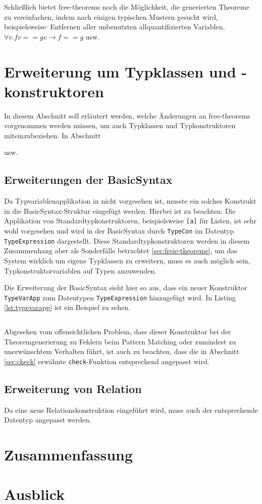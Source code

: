 \documentclass[11pt]{article} %
\begin{document}
Schließlich bietet free-theorems noch die Möglichkeit, die generierten Theoreme zu vereinfachen, indem nach einigen typischen
Mustern gesucht wird, beispielsweise: Entfernen aller unbenutzten allquantifizierten Variablen, $\forall v. f v == g v \rightarrow f == g$ usw.

\section{Erweiterung um Typklassen und -konstruktoren}
\label{sec:erweiterung-typklassen}

In diesem Abschnitt soll erläutert werden, welche Änderungen an free-theorems vorgenommen werden müssen, um auch Typklassen und Typkonstruktoren miteinzubeziehen. In
Abschnitt 

usw.

\subsection{Erweiterungen der BasicSyntax}

Da Typvariablenapplikation in \cite{freetheorems} nicht vorgesehen ist, musste ein solches Konstrukt in die BasicSyntax-Struktur eingefügt werden. Hierbei ist zu beachten: Die Applikation
von Standardtypkonstruktoren, beispielsweise \texttt{[a]} für Listen, ist sehr wohl vorgesehen und wird in der BasicSyntax durch \texttt{TypeCon} im Datentyp \texttt{TypeExpression} dargestellt.  Diese Standardtypkonstruktoren werden in diesem Zusammenhang aber als Sonderfälle betrachtet \ref{sec:freie-theoreme}, um das System wirklich um eigene Typklassen zu erweitern, muss es auch möglich sein, Typkonstruktorvariablen auf Typen anzuwenden.

Die Erweiterung der BasicSyntax sieht hier so aus, dass ein neuer Konstruktor \texttt{TypeVarApp} zum Datentypen \texttt{TypeExpression} hinzugefügt wird. In Listing \ref{lst:typevarapp} ist ein Beispiel zu sehen.

\inputminted[tabsize=2]{haskell}{typevarapp.hs}

Abgesehen vom offensichtlichen Problem, dass dieser Konstruktor bei der Theoremgenerierung zu Fehlern beim Pattern Matching oder zumindest zu unerwünschtem Verhalten führt,
ist auch zu beachten, dass die in Abschnitt \ref{sec:check} erwähnte \texttt{check}-Funktion entsprechend angepasst wird.

\subsection{Erweiterung von Relation}

Da eine neue Relationskonstruktion eingeführt wird, muss auch der entsprechende Datentyp angepasst werden.

\section{Zusammenfassung}

\section{Ausblick}



\end{document}
